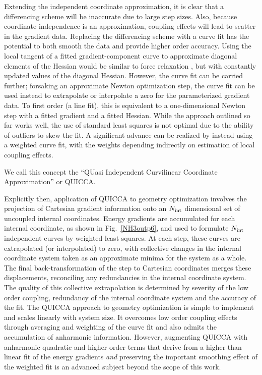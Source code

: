 \documentclass[prl,aps,preprint,superbib,12pt]{revtex4}
\begin{document}
Extending the independent coordinate approximation, it is clear that a differencing scheme will be inaccurate 
due to large step sizes.  Also, because coordinate independence is an approximation, coupling effects will lead
to scatter in the gradient data.  Replacing  the differencing scheme with a curve fit has the potential to both 
smooth the data and provide higher order accuracy.  
Using the local tangent of a fitted gradient-component curve 
to approximate 
diagonal elements of the Hessian 
would be similar to force relaxation \cite{PPulay77,HSellers78,CVanAlsenoy98}, but with constantly updated 
values of the diagonal Hessian.  However, the curve fit can be carried further;  forsaking an approximate Newton optimization step, 
the curve fit can be used instead to extrapolate or interpolate a zero for the parameterized gradient data.  
To first order (a line fit), this is equivalent to a one-dimensional Newton step with a fitted gradient and a 
fitted Hessian.   While the approach outlined so far works well, the use of standard least squares is not 
optimal due to the ability of outliers to skew the fit.  A significant advance can be realized by instead using 
a weighted curve fit, with the weights depending indirectly on estimation of local coupling effects. 

We call this concept the ``QUasi Independent Curvilinear Coordinate Approximation'' or QUICCA. 

Explicitly then, application of QUICCA to geometry optimization involves the  projection of Cartesian 
gradient information onto 
an $N_{\rm int}$ dimensional set of uncoupled internal coordinates.  
Energy gradients 
are accumulated for each internal coordinate, as shown in Fig.~\ref{NH3outp6}, and used to formulate 
$N_{\rm int}$ independent curves by weighted least squares.  At each step, these curves are extrapolated 
(or interpolated) to zero, with collective changes in the internal coordinate system taken as an approximate 
minima for the system as a whole. The final back-transformation of the step to Cartesian coordinates merges 
these displacements, reconciling any redundancies in the internal coordinate system. The quality of this 
collective extrapolation is determined by severity of the low order coupling, redundancy of the internal 
coordinate system and the accuracy of the fit.  The QUICCA approach to geometry optimization is simple to 
implement and scales linearly with system size.  It overcomes low order coupling effects through averaging and 
weighting of the curve fit and also admits the accumulation of anharmonic information.  
However,  augmenting QUICCA with anharmonic quadratic and higher order 
terms that derive from a higher than linear fit of the 
energy gradients {\em and} preserving the important smoothing 
effect of the weighted fit is an advanced subject beyond the 
scope of this work.
\end{document}
